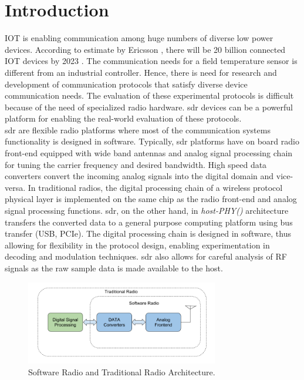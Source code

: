\chapter{Introduction}
\ac{IOT} is enabling communication among huge numbers of diverse low power devices.  
According to estimate by Ericsson \cite{noauthor_internet_2017}, there will be 20 billion connected \ac{IOT} devices by 2023 . 
The communication needs for a field temperature sensor is different from an industrial controller. 
Hence, there is need for research and development of communication protocols that satisfy diverse device communication needs. 
The evaluation of these experimental protocols is difficult because of the need of specialized radio hardware. 
\ac{sdr} devices can be a powerful platform for enabling the real-world evaluation of these protocols.\\

\ac{sdr} are flexible radio platforms where most of the communication systems functionality is designed in software. Typically, \ac{sdr} platforms have on board radio front-end equipped with wide band antennas and analog signal processing chain for tuning the carrier frequency and desired bandwidth. High speed data converters convert the incoming analog signals into the digital domain and vice-versa. In traditional radios, the digital processing chain of a wireless protocol physical layer is implemented on the same chip as the radio front-end and analog signal processing functions. \ac{sdr}, on the other hand, in \textit{host-PHY(\cite{schmid_experimental_2007})} architecture transfers the converted data to a general purpose computing platform using bus transfer (USB, PCIe).  The digital processing chain is designed in software, thus allowing for flexibility in the protocol design, enabling experimentation in decoding and modulation techniques. \ac{sdr} also allows for careful analysis of RF signals as the raw sample data is made available to the host.\\

\begin{figure}[!h]
\centering
\includegraphics[width=0.75\textwidth]{Figure/SDRSystem.png}
\caption{Software Radio and Traditional Radio Architecture.}
\label{sdr_architecture}
\end{figure}



